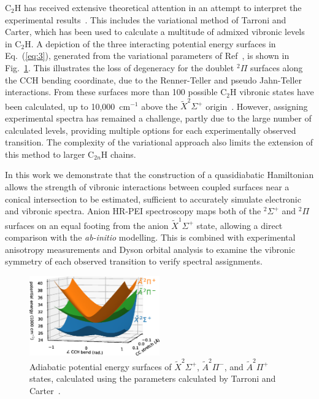 \documentclass[aip,graphicx]{revtex4-1}
\begin{document}
C$_2$H has received extensive theoretical attention in an attempt to interpret the experimental results~\cite{per90,per91,per91b,per91c,per92,car00,tar03,tar04,for10,sta21,gul21}. This includes the variational method of Tarroni and Carter, which has been used to calculate a multitude of admixed vibronic levels in C$_2$H. A depiction of the three interacting potential energy surfaces in Eq.~(\ref{eq:3}), generated from the variational parameters of Ref~, is shown in Fig.~\ref{fig:1}. This illustrates the loss of degeneracy for the doublet $^2\Pi$ surfaces along the CCH bending coordinate, due to the Renner-Teller and pseudo Jahn-Teller interactions. From these surfaces more than 100 possible C$_2$H vibronic states have been calculated, up to 10,000~cm$^{-1}$ above the $\tilde{X} ^2\Sigma^+$ origin~\cite{tar03}. However, assigning experimental spectra has remained a challenge, partly due to the large number of calculated levels, providing multiple options for each experimentally observed transition. The complexity of the variational approach also limits the extension of this method to larger C$_{2n}$H chains.

In this work we demonstrate that the construction of a quasidiabatic Hamiltonian allows the strength of vibronic interactions between coupled surfaces near a conical intersection to be estimated, sufficient to accurately simulate electronic and vibronic spectra. Anion HR-PEI spectroscopy maps both of the $^2\Sigma^+$ and $^2\Pi$ surfaces on an equal footing from the anion $\tilde{X}^1\Sigma^+$ state, allowing a direct comparison with the \emph{ab-initio} modelling. This is combined with experimental anisotropy measurements and Dyson orbital analysis to examine the vibronic symmetry of each observed transition to verify spectral assignments.

\begin{figure}
	\centering
	\includegraphics[width=0.5\textwidth]{figures/Fig1}
	\caption{Adiabatic potential energy surfaces of $\tilde{X}^2\Sigma^+$, $\tilde{A}^2\Pi^-$, and $\tilde{A}^2\Pi^+$ states, calculated using the parameters calculated by Tarroni and Carter~\cite{tar03}.}
	\label{fig:1}
\end{figure}
\end{document}
